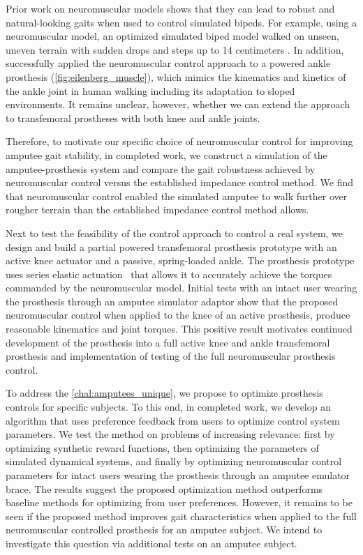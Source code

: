 Prior work on neuromuscular models shows that they can lead to robust and
natural-looking gaits when used to control simulated bipeds. For example, using
a neuromuscular model, an optimized simulated biped model walked on unseen,
uneven terrain with sudden drops and steps up to 14 centimeters
\citep{song2015neural}. In addition, \citet{eilenberg2010control} successfully
applied the neuromuscular control approach to a powered ankle prosthesis
(\cref{fig:eilenberg_muscle}), which mimics the kinematics and kinetics of the
ankle joint in human walking including its adaptation to sloped environments. It
remains unclear, however, whether we can extend the approach to transfemoral
prostheses with both knee and ankle joints.

Therefore, to motivate our specific choice of neuromuscular control for
improving amputee gait stability, in completed work, we construct a simulation
of the amputee-prosthesis system and compare the gait robustness achieved by
neuromuscular control versus the established impedance control method. We find
that neuromuscular control enabled the simulated amputee to walk further over
rougher terrain than the established impedance control method allows.

Next to test the feasibility of the control approach to control a real system, we
design and build a partial powered transfemoral prosthesis prototype with an
active knee actuator and a passive, spring-loaded ankle. The prosthesis
prototype uses series elastic actuation~\citep{pratt1995series} that allows it
to accurately achieve the torques commanded by the neuromuscular model. Initial
tests with an intact user wearing the prosthesis through an amputee simulator
adaptor show that the proposed neuromuscular control when applied to the knee of
an active prosthesis, produce reasonable kinematics and joint torques. This
positive result motivates continued development of the prosthesis into a
full active knee and ankle transfemoral prosthesis and implementation of testing
of the full neuromuscular prosthesis control.

To address the \cref{chal:amputees_unique}, we propose to optimize prosthesis
controls for specific subjects. To this end, in completed work, we develop an
algorithm that uses preference feedback from users to optimize control system
parameters. We test the method on problems of increasing relevance: first by
optimizing synthetic reward functions, then optimizing the parameters of
simulated dynamical systems, and finally by optimizing neuromuscular control
parameters for intact users wearing the prosthesis through an amputee emulator
brace. The results suggest the proposed optimization method outperforms baseline
methods for optimizing from user preferences. However, it remains to be seen if
the proposed method improves gait characteristics when applied to the full
neuromuscular controlled prosthesis for an amputee subject. We intend to
investigate this question via additional tests on an amputee subject.

